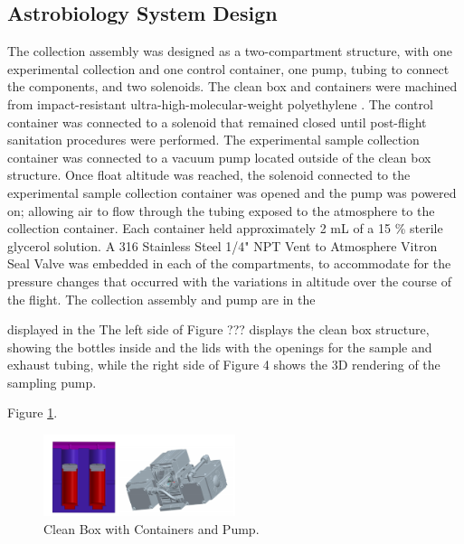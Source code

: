 \subsection{Astrobiology System Design}
\label{sec:Astrobiology Design}
The collection assembly was designed as a two-compartment structure, with one experimental collection and one control container, one pump, tubing to connect the components, and two solenoids. The clean box and containers were machined from impact-resistant ultra-high-molecular-weight polyethylene \cite{cleanbox}. The control container was connected to a solenoid that remained closed until post-flight sanitation procedures were performed. The experimental sample collection container was connected to a vacuum pump located outside of the clean box structure. Once float altitude was reached, the solenoid connected to the experimental sample collection container was opened and the pump was powered on; allowing air to flow through the tubing exposed to the atmosphere to the collection container. Each container held approximately 2 mL of a 15 \% sterile glycerol solution. A 316 Stainless Steel 1/4" NPT Vent to Atmosphere Vitron Seal Valve was embedded in each of the compartments, to accommodate for the pressure changes that occurred with the variations in altitude over the course of the flight. The collection assembly and pump are in the 

displayed in the The left side of Figure ??? displays the clean box structure, showing the bottles inside and the lids with the openings for the sample and exhaust tubing, while the right side of Figure 4 shows the 3D rendering of the sampling pump.

Figure \ref{fig:Astro System}.


\begin{figure}[H]
	\begin{center}
		\includegraphics[width=0.5\textwidth]{figures/Astro_Figs.pdf}
		\caption{Clean Box with Containers and Pump.}
		\label{fig:Astro System}
	\end{center}
\end{figure}